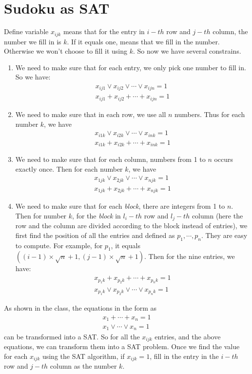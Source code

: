 \documentclass{article}
\begin{document}
	\section{Sudoku as SAT}
		Define variable $x_{ijk}$ means that for the entry in $i-th$ row and $j-th$ column, the number we fill in is $k$. If it equals one, means that we fill in the number. Otherwise we won't choose to fill it using $k$. So now we have several constrains.
		\begin{enumerate}
			\item We need to make sure that for each entry, we only pick one number to fill in. So we have:\begin{gather}
			x_{ij1} \vee x_{ij2} \vee \cdots \vee x_{ijn} = 1 \\
			x_{ij1} + x_{ij2} + \cdots + x_{ijn} = 1
			\end{gather}
			\item We need to make sure that in each row, we use all $n$ numbers. Thus for each number $k$, we have \begin{gather}
			x_{i1k} \vee x_{i2k} \vee \cdots \vee x_{ink} = 1\\
			x_{i1k} + x_{i2k} + \cdots + x_{ink} = 1
			\end{gather}
			\item We need to make sure that for each column, numbers from 1 to $n$ occurs exactly once. Then for each number $k$, we have
			\begin{gather}
				x_{1jk} \vee x_{2jk} \vee \cdots \vee x_{njk} = 1\\
				x_{1jk} + x_{2jk} + \cdots + x_{njk} = 1
			\end{gather}
			\item We need to make sure that for each \emph{block}, there are integers from 1 to $n$. Then for number $k$, for the \emph{block} in $l_i-th$ row and $l_j-th$ column (here the row and the column are divided according to the block instead of entries), we first find the position of all the entries and defined as $p_1, \cdots, p_n$. They are easy to compute. For example, for $p_1$, it equals $((i - 1) \times \sqrt{n} + 1, (j - 1) \times \sqrt{n} + 1)$. Then for the nine entries, we have:
			\begin{gather}
			x_{p_1k} + x_{p_2k} + \cdots + x_{p_nk} = 1\\
			x_{p_1k} \vee x_{p_2k} \vee \cdots \vee x_{p_nk} = 1
			\end{gather}
			\end{enumerate}
			As shown in the class, the equations in the form as \begin{gather}
				x_1 + \cdots + x_n = 1 \\
				x_1 \vee \cdots \vee x_n = 1
			\end{gather}
			can be transformed into a SAT. So for all the $x_{ijk}$ entries, and the above equations, we can transform them into a SAT problem. Once we find the value for each $x_{ijk}$ using the SAT algorithm, if $x_{ijk} = 1$, fill in the entry in the $i-th$ row and $j-th$ column as the number $k$.
\end{document}
